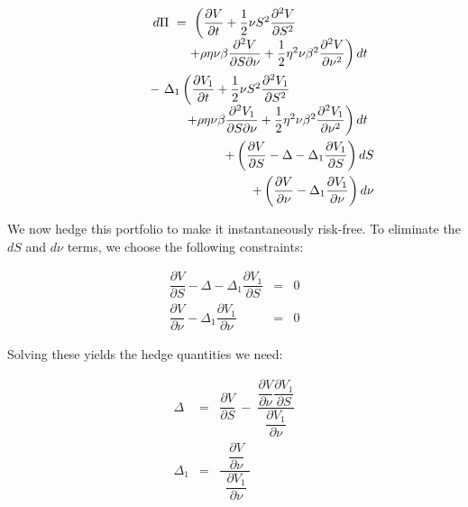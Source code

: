 \documentclass[uplatex,a4j,12pt,dvipdfmx]{jsarticle}
\begin{document}
\begin{eqnarray*}
	&&
	\begin{array}{l}
		d \Pi \ = \
		\left(
		\dfrac{\partial V}{\partial t}
		+
		\dfrac{1}{2}
		\nu S^{2}
		\dfrac{\partial^{2} V}{\partial S^{2}}
		\right.
		\\ \hspace{10mm}
		\left.
		+
		\rho \eta \nu \beta
		\dfrac{\partial^{2} V}{\partial S \partial \nu}
		+
		\dfrac{1}{2}
		\eta^{2} \nu \beta^{2}
		\dfrac{\partial^{2} V}{\partial \nu^{2}}
		\right)dt
	\end{array}
	\\ && \hspace{10mm}
	\begin{array}{l}
		- \
		\Delta_{1}
		\left(
		\dfrac{\partial V_{1}}{\partial t}
		+
		\dfrac{1}{2}
		\nu S^{2}
		\dfrac{\partial^{2} V_{1}}{\partial S^{2}}
		\right.
		\\ \hspace{10mm}
		\left.
		+
		\rho \eta \nu \beta
		\dfrac{\partial^{2} V_{1}}{\partial S \partial \nu}
		+
		\dfrac{1}{2}
		\eta^{2} \nu \beta^{2}
		\dfrac{\partial^{2} V_{1}}{\partial \nu^{2}}
		\right)dt
	\end{array}
	\\ &&
	\hspace{10mm} +
	\left(
	\dfrac{\partial V}{\partial S}
	-
	\Delta
	-
	\Delta_{1}
	\dfrac{\partial V_{1}}{\partial S}
	\right)
	dS
	\\ &&
	\hspace{10mm} +
	\left(
	\dfrac{\partial V}{\partial \nu}
	-
	\Delta_{1}
	\dfrac{\partial V_{1}}{\partial \nu}
	\right)
	d\nu
\end{eqnarray*}

We now hedge this portfolio to make it instantaneously risk-free. To eliminate the $dS$ and $d\nu$ terms, we choose the following constraints:

\begin{eqnarray*}
	\dfrac{\partial V}{\partial S}
	-
	\Delta
	-
	\Delta_{1}
	\dfrac{\partial V_{1}}{\partial S}
	&=&
	0
	\\
	\dfrac{\partial V}{\partial \nu}
	-
	\Delta_{1}
	\dfrac{\partial V_{1}}{\partial \nu}
	&=&
	0
\end{eqnarray*}

Solving these yields the hedge quantities we need:

\begin{eqnarray*}
	\Delta
	&=&
	\dfrac{\partial V}{\partial S}
	\ - \
	\dfrac{
		\dfrac{\partial V}{\partial \nu}
		\dfrac{\partial V_{1}}{\partial S}
	}{
		\dfrac{\partial V_{1}}{\partial \nu}
	}
	\\
	\Delta_{1}
	&=&
	\dfrac{ \ \
		\dfrac{\partial V}{\partial \nu}
		\
	}{ \ \
		\dfrac{\partial V_{1}}{\partial \nu}
		\
	}
\end{eqnarray*}
\end{document}
